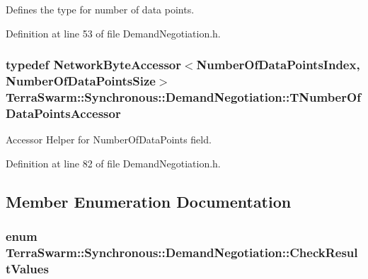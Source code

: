 Defines the type for number of data points. 



Definition at line 53 of file Demand\-Negotiation.\-h.

\hypertarget{class_terra_swarm_1_1_synchronous_1_1_demand_negotiation_a86cc2804c82d511a7b9e037d041236bd}{
\subsubsection[{T\-Number\-Of\-Data\-Points\-Accessor}]{\setlength{\rightskip}{0pt plus 5cm}typedef {\bf Network\-Byte\-Accessor}$<${\bf Number\-Of\-Data\-Points\-Index}, {\bf Number\-Of\-Data\-Points\-Size}$>$ {\bf Terra\-Swarm\-::\-Synchronous\-::\-Demand\-Negotiation\-::\-T\-Number\-Of\-Data\-Points\-Accessor}\hspace{0.3cm}{\ttfamily [private]}}}\label{class_terra_swarm_1_1_synchronous_1_1_demand_negotiation_a86cc2804c82d511a7b9e037d041236bd}


Accessor Helper for Number\-Of\-Data\-Points field. 



Definition at line 82 of file Demand\-Negotiation.\-h.



\subsection{Member Enumeration Documentation}
\hypertarget{class_terra_swarm_1_1_synchronous_1_1_demand_negotiation_a62e3d42f7a50e61a19ac2bc6349c302d}{
\subsubsection[{Check\-Result\-Values}]{\setlength{\rightskip}{0pt plus 5cm}enum {\bf Terra\-Swarm\-::\-Synchronous\-::\-Demand\-Negotiation\-::\-Check\-Result\-Values}}}\label{class_terra_swarm_1_1_synchronous_1_1_demand_negotiation_a62e3d42f7a50e61a19ac2bc6349c302d}


